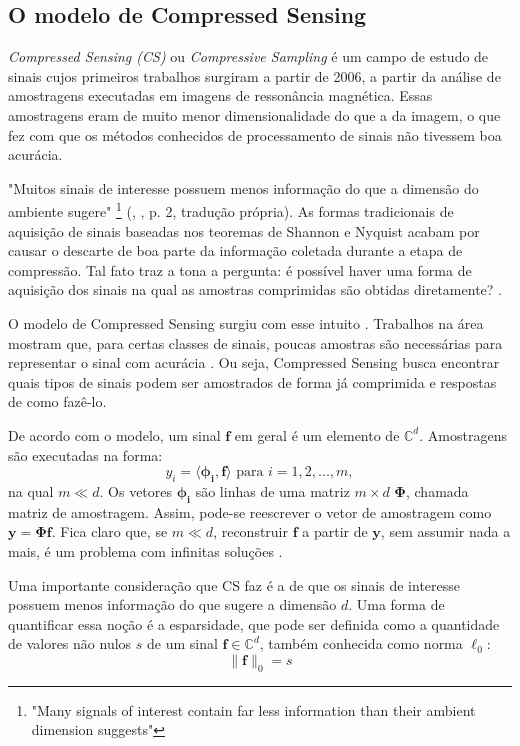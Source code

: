 \documentclass[cic,tc]{iiufrgs}
\renewcommand{\vec}[1]{\bm{#1}}
\begin{document}
\subsection{O modelo de Compressed Sensing}
\textit{Compressed Sensing (CS)} ou \textit{Compressive Sampling} é um campo de estudo de sinais cujos
primeiros trabalhos surgiram a partir de 2006, a partir da análise de amostragens executadas em imagens de 
ressonância magnética. Essas amostragens eram de muito menor dimensionalidade do que a da imagem, o que 
fez com que os métodos conhecidos de processamento de sinais não tivessem boa acurácia.

"Muitos sinais de interesse possuem menos informação do que a dimensão do ambiente sugere"
\footnote{"Many signals of interest contain far less information than their ambient dimension suggests"}
(\citeauthor{chen2015compressed}, \citeyear{chen2015compressed}, p. 2, tradução própria).
As formas tradicionais de aquisição de sinais baseadas nos teoremas de Shannon e Nyquist acabam por causar o descarte
de boa parte da informação coletada durante a etapa de compressão. Tal fato traz a tona a pergunta: é possível haver 
uma forma de aquisição dos sinais na qual as amostras comprimidas são obtidas diretamente? \cite{chen2015compressed}.

O modelo de Compressed Sensing surgiu com esse intuito \cite{DonohoCS}. Trabalhos na área mostram que, para certas classes
de sinais, poucas amostras são necessárias para representar o sinal com acurácia \cite{chen2015compressed}.
Ou seja, Compressed Sensing busca encontrar quais tipos
de sinais podem ser amostrados de forma já comprimida e respostas de como fazê-lo.

De acordo com o modelo, um sinal $ \vec{f} $ em geral é um elemento de $ \mathbb{C}^d $. Amostragens são executadas na forma:
\begin{equation}
    y_i = \langle \vec{\phi_i}, \vec{f} \rangle \text{ para } i=1,2,...,m, 
\end{equation}
na qual $m \ll d$. Os vetores $\vec{\phi_i}$ são linhas de uma matriz $m \times d$ $\mathbf{\Phi}$, chamada matriz 
de amostragem. Assim, pode-se reescrever o vetor de amostragem como $\vec{y} = \mathbf{\Phi} \vec{f}$. Fica claro que, 
se $ m \ll d$, reconstruir $\vec{f}$ a partir de $\vec{y}$, sem assumir nada a mais, é um problema 
com infinitas soluções \cite{chen2015compressed}.

Uma importante consideração que CS faz é a de que os sinais de interesse possuem menos informação do que sugere a 
dimensão $d$. Uma forma de quantificar essa noção é a esparsidade, que pode ser definida como a quantidade de valores não
nulos $s$ de um sinal $\vec{f} \in \mathbb{C}^d$, também conhecida como norma $\ell_0$:
\begin{equation}
    \lVert \vec{f} \rVert_0 = s
\end{equation}
\end{document}
